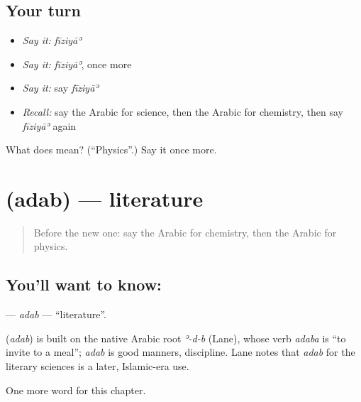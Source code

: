 \subsection*{Your turn}
\begin{itemize}
\raggedright
  \item \emph{Say it:} \emph{fīziyāʾ}
  \item \emph{Say it:} \emph{fīziyāʾ}, once more
  \item \emph{Say it:} say \emph{fīziyāʾ}
  \item \emph{Recall:} say the Arabic for science, then the Arabic for chemistry, then say \emph{fīziyāʾ} again
\end{itemize}

\begin{tcolorbox}[breakable,colback=teal!4,colframe=teal!35!black,title={Before you move on}]
What does  mean? (\textquotedblleft{}Physics\textquotedblright{}.) Say it once more.
\end{tcolorbox}
\section[\texorpdfstring{\ar{أدب} (adab)}{أدب (adab)}]{ (adab) — literature}

\label{lesson:AR-C222-adab}



\begin{quote}
Before the new one: say the Arabic for chemistry, then the Arabic for physics.
\end{quote}

\subsection*{You'll want to know: }
\textbf{} — \emph{adab} — \textquotedblleft{}literature\textquotedblright{}.

\begin{cousinweb}
\textbf{} (\emph{adab}) is built on the native Arabic root \emph{ʾ-d-b} (Lane), whose verb \emph{adaba} is \textquotedblleft{}to invite to a meal\textquotedblright{}; \emph{adab} is good manners, discipline. Lane notes that \emph{adab} for the literary sciences is a later, Islamic-era use.
\end{cousinweb}

\begin{grammarlens}[title={What you've built}]
One more word for this chapter.
\end{grammarlens}

